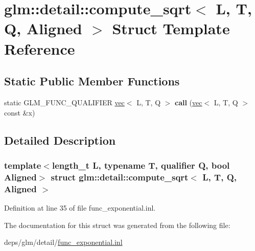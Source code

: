\hypertarget{structglm_1_1detail_1_1compute__sqrt}{}\section{glm\+:\+:detail\+:\+:compute\+\_\+sqrt$<$ L, T, Q, Aligned $>$ Struct Template Reference}
\label{structglm_1_1detail_1_1compute__sqrt}
\subsection*{Static Public Member Functions}
\begin{DoxyCompactItemize}
\item 
\mbox{\label{structglm_1_1detail_1_1compute__sqrt_a356d5e5be126cceb0086242ff6c9d905}} 
static G\+L\+M\+\_\+\+F\+U\+N\+C\+\_\+\+Q\+U\+A\+L\+I\+F\+I\+ER \hyperlink{structglm_1_1vec}{vec}$<$ L, T, Q $>$ {\bfseries call} (\hyperlink{structglm_1_1vec}{vec}$<$ L, T, Q $>$ const \&x)
\end{DoxyCompactItemize}


\subsection{Detailed Description}
\subsubsection*{template$<$length\+\_\+t L, typename T, qualifier Q, bool Aligned$>$\newline
struct glm\+::detail\+::compute\+\_\+sqrt$<$ L, T, Q, Aligned $>$}



Definition at line 35 of file func\+\_\+exponential.\+inl.



The documentation for this struct was generated from the following file\+:\begin{DoxyCompactItemize}
\item 
deps/glm/detail/\hyperlink{func__exponential_8inl}{func\+\_\+exponential.\+inl}\end{DoxyCompactItemize}
